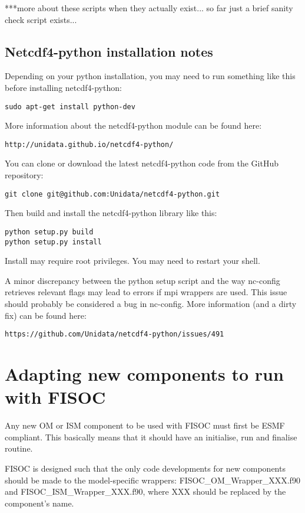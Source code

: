 \documentclass[12pt]{article}
\begin{document}
***more about these scripts when they actually exist... so far just a brief sanity 
check script exists...




\subsection{Netcdf4-python installation notes}


Depending on your python installation, you may need to run something like this
before installing netcdf4-python:
\begin{lstlisting}
sudo apt-get install python-dev
\end{lstlisting}
More information about the netcdf4-python module can be found here:
\begin{lstlisting}
http://unidata.github.io/netcdf4-python/
\end{lstlisting}
You can clone or download the latest netcdf4-python code from the GitHub 
repository:
\begin{lstlisting}
git clone git@github.com:Unidata/netcdf4-python.git 
\end{lstlisting}
Then build and install the netcdf4-python library like this:
\begin{lstlisting}
python setup.py build
python setup.py install
\end{lstlisting}
Install may require root privileges.
You may need to restart your shell.  

A minor discrepancy between the python setup script and the way nc-config 
retrieves relevant flags may lead to errors if mpi wrappers are used. 
This issue should probably be considered a bug in nc-config. 
More information (and a dirty fix) can be found here:
\begin{lstlisting}
https://github.com/Unidata/netcdf4-python/issues/491
\end{lstlisting}






\section{Adapting new components to run with  FISOC}
\label{sec:FISOC_SDG}

Any new OM or ISM component to be used with FISOC must first be ESMF compliant.  This basically 
means that it should have an initialise, run and finalise routine. 

FISOC is designed such that the only code developments for new components should be made to the 
model-specific wrappers: FISOC\_OM\_Wrapper\_XXX.f90 and FISOC\_ISM\_Wrapper\_XXX.f90, where 
XXX should be replaced by the component's name.
\end{document}
